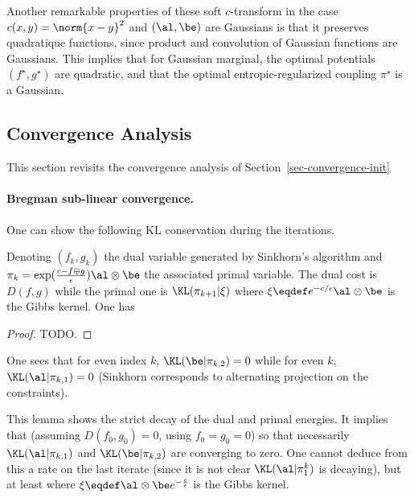 \begin{rem}
	Another remarkable properties of these soft $c$-transform in the case $c(x,y)=\norm{x-y}^2$ and $(\al,\be)$ are Gaussians is that it preserves quadratique functions, since product and convolution of Gaussian functions are Gaussians.
	This implies that for Gaussian marginal, the optimal potentials $(f^\star,g^\star)$ are quadratic, and that the optimal entropic-regularized coupling $\pi^\star$ is a Gaussian.
\end{rem}
  

\subsection{Convergence Analysis}
\label{sec-convergence-dual}


This section revisits the convergence analysis of Section~\ref{sec-convergence-init}

\paragraph{Bregman sub-linear convergence.}

One can show the following KL conservation during the iterations.

\begin{proposition}
	Denoting $(f_k,g_k)$ the dual variable generated by Sinkhorn's algorithm and $\pi_k = \exp(\frac{c-f \oplus g}{\epsilon}) \al \otimes \be$ the associated primal variable. The dual cost is $D(f,g)$ while the primal one is
	$\KL(\pi_{k+1}|\xi)$ where $\xi \eqdef e^{-c/\epsilon} \al \otimes \be$ is the Gibbs kernel. One has
\end{proposition}

\begin{proof}
	TODO. 
\end{proof}

One sees that for even index $k$, $\KL(\be|\pi_{k,2})=0$ while for even $k$, $\KL(\al|\pi_{k,1})=0$ (Sinkhorn corresponds to alternating projection on the constraints).

This lemma shows the strict decay of the dual and primal energies.
It implies that (assuming $D(f_0,g_0)=0$, using $f_0=g_0=0$)
so that necessarily $\KL(\al|\pi_{k,1})$ and $\KL(\be|\pi_{k,2})$ are converging to zero. One cannot deduce from this a rate on the last iterate (since it is not clear $\KL(\al|\pi_1^k)$ is decaying), but at least 
where $\xi \eqdef \al\otimes\be e^{-\frac{c}{\epsilon}}$ is the Gibbs kernel.

